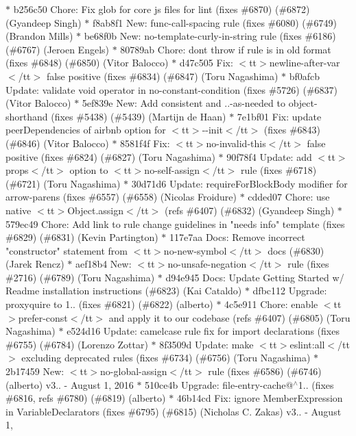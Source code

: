 \begin{DoxyItemize}
\texorpdfstring{$\ast$}{*} b256c50 Chore\+: Fix glob for core js files for lint (fixes \#6870) (\#6872) (\+Gyandeep Singh) \texorpdfstring{$\ast$}{*} f8ab8f1 New\+: func-\/call-\/spacing rule (fixes \#6080) (\#6749) (\+Brandon Mills) \texorpdfstring{$\ast$}{*} be68f0b New\+: no-\/template-\/curly-\/in-\/string rule (fixes \#6186) (\#6767) (\+Jeroen Engels) \texorpdfstring{$\ast$}{*} 80789ab Chore\+: don\textquotesingle{}t throw if rule is in old format (fixes \#6848) (\#6850) (\+Vitor Balocco) \texorpdfstring{$\ast$}{*} d47c505 Fix\+: $<$tt$>$newline-\/after-\/var$<$/tt$>$ false positive (fixes \#6834) (\#6847) (\+Toru Nagashima) \texorpdfstring{$\ast$}{*} bf0afcb Update\+: validate void operator in no-\/constant-\/condition (fixes \#5726) (\#6837) (\+Vitor Balocco) \texorpdfstring{$\ast$}{*} 5ef839e New\+: Add consistent and ..-\/as-\/needed to object-\/shorthand (fixes \#5438) (\#5439) (\+Martijn de Haan) \texorpdfstring{$\ast$}{*} 7e1bf01 Fix\+: update peer\+Dependencies of airbnb option for $<$tt$>$-\/-\/init$<$/tt$>$ (fixes \#6843) (\#6846) (\+Vitor Balocco) \texorpdfstring{$\ast$}{*} 8581f4f Fix\+: $<$tt$>$no-\/invalid-\/this$<$/tt$>$ false positive (fixes \#6824) (\#6827) (\+Toru Nagashima) \texorpdfstring{$\ast$}{*} 90f78f4 Update\+: add $<$tt$>$props$<$/tt$>$ option to $<$tt$>$no-\/self-\/assign$<$/tt$>$ rule (fixes \#6718) (\#6721) (\+Toru Nagashima) \texorpdfstring{$\ast$}{*} 30d71d6 Update\+: \textquotesingle{}require\+For\+Block\+Body\textquotesingle{} modifier for \textquotesingle{}arrow-\/parens\textquotesingle{} (fixes \#6557) (\#6558) (\+Nicolas Froidure) \texorpdfstring{$\ast$}{*} cdded07 Chore\+: use native $<$tt$>$\+Object.\+assign$<$/tt$>$ (refs \#6407) (\#6832) (\+Gyandeep Singh) \texorpdfstring{$\ast$}{*} 579ec49 Chore\+: Add link to rule change guidelines in "{}needs info"{} template (fixes \#6829) (\#6831) (\+Kevin Partington) \texorpdfstring{$\ast$}{*} 117e7aa Docs\+: Remove incorrect "{}constructor"{} statement from $<$tt$>$no-\/new-\/symbol$<$/tt$>$ docs (\#6830) (\+Jarek Rencz) \texorpdfstring{$\ast$}{*} aef18b4 New\+: $<$tt$>$no-\/unsafe-\/negation$<$/tt$>$ rule (fixes \#2716) (\#6789) (\+Toru Nagashima) \texorpdfstring{$\ast$}{*} d94e945 Docs\+: Update Getting Started w/ Readme installation instructions (\#6823) (\+Kai Cataldo) \texorpdfstring{$\ast$}{*} dfbc112 Upgrade\+: proxyquire to 1.. (fixes \#6821) (\#6822) (alberto) \texorpdfstring{$\ast$}{*} 4c5e911 Chore\+: enable $<$tt$>$prefer-\/const$<$/tt$>$ and apply it to our codebase (refs \#6407) (\#6805) (\+Toru Nagashima) \texorpdfstring{$\ast$}{*} e524d16 Update\+: camelcase rule fix for import declarations (fixes \#6755) (\#6784) (\+Lorenzo Zottar) \texorpdfstring{$\ast$}{*} 8f3509d Update\+: make $<$tt$>$eslint\+:all$<$/tt$>$ excluding deprecated rules (fixes \#6734) (\#6756) (\+Toru Nagashima) \texorpdfstring{$\ast$}{*} 2b17459 New\+: $<$tt$>$no-\/global-\/assign$<$/tt$>$ rule (fixes \#6586) (\#6746) (alberto)  v3.. -\/ August 1, 2016  \texorpdfstring{$\ast$}{*} 510ce4b Upgrade\+: file-\/entry-\/cache@\texorpdfstring{$^\wedge$}{\string^}1.. (fixes \#6816, refs \#6780) (\#6819) (alberto) \texorpdfstring{$\ast$}{*} 46b14cd Fix\+: ignore Member\+Expression in Variable\+Declarators (fixes \#6795) (\#6815) (\+Nicholas C. Zakas)  v3.. -\/ August 1, 
\end{DoxyItemize}
